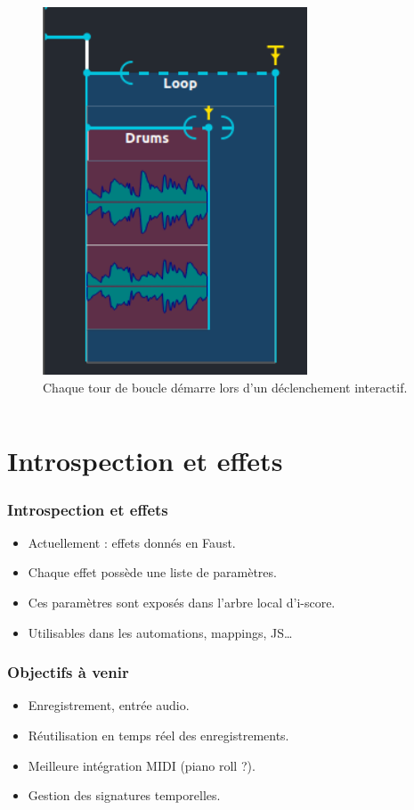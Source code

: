 \documentclass{beamer}
\begin{document}
\begin{frame}
\begin{columns}
\begin{column}{0.5\textwidth}
\begin{figure}
				\includegraphics[width=0.7\textwidth]{images/loop2.png}
				\caption{Chaque tour de boucle démarre lors d'un déclenchement interactif.}
			\end{figure}
		\end{column}
	\end{columns}
\end{frame}  

\section{Introspection et effets}
\begin{frame}
	\frametitle{Introspection et effets}    
	\Large
	\begin{itemize}
		\item<1-> Actuellement : effets donnés en Faust.
		\item<2-> Chaque effet possède une liste de paramètres.
		\item<3-> Ces paramètres sont exposés dans l'arbre local d'i-score.
		\item<4-> Utilisables dans les automations, mappings, JS\dots
	\end{itemize}
	
	
	
\end{frame}

\begin{frame}
	\frametitle{Objectifs à venir} 
	\Large
	\begin{itemize}
		\item<1> Enregistrement, entrée audio.
		\item<2> Réutilisation en temps réel des enregistrements.
		\item<3> Meilleure intégration MIDI (piano roll ?).
		\item<4> Gestion des signatures temporelles.
		
	\end{itemize}
\end{frame}    
\end{document}
